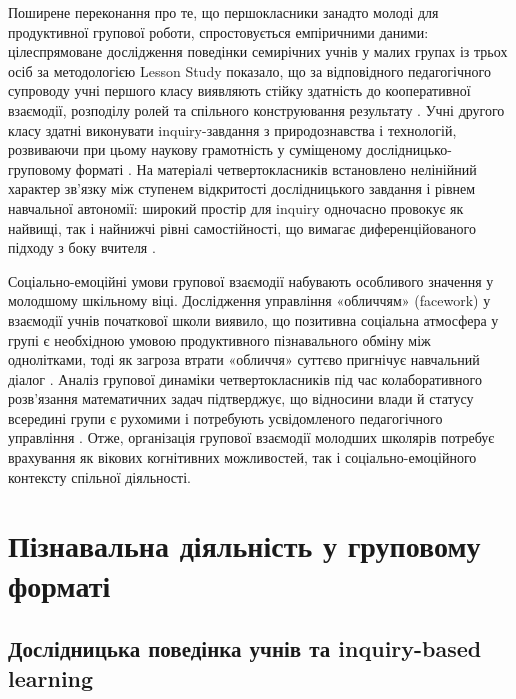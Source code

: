 \documentclass[a4paper,12pt]{article}
\begin{document}
Поширене переконання про те, що першокласники занадто молоді для продуктивної групової роботи, спростовується емпіричними даними: цілеспрямоване дослідження поведінки семирічних учнів у малих групах із трьох осіб за методологією Lesson Study показало, що за відповідного педагогічного супроводу учні першого класу виявляють стійку здатність до кооперативної взаємодії, розподілу ролей та спільного конструювання результату \parencite{Jakavonytė-Staškuvienė2025}. Учні другого класу здатні виконувати inquiry-завдання з природознавства і технологій, розвиваючи при цьому наукову грамотність у суміщеному дослідницько-груповому форматі \parencite{Zuñiga-Quispe2025365}. На матеріалі четвертокласників встановлено нелінійний характер зв'язку між ступенем відкритості дослідницького завдання і рівнем навчальної автономії: широкий простір для inquiry одночасно провокує як найвищі, так і найнижчі рівні самостійності, що вимагає диференційованого підходу з боку вчителя \parencite{Aming'a2026}.

Соціально-емоційні умови групової взаємодії набувають особливого значення у молодшому шкільному віці. Дослідження управління «обличчям» (facework) у взаємодії учнів початкової школи виявило, що позитивна соціальна атмосфера у групі є необхідною умовою продуктивного пізнавального обміну між однолітками, тоді як загроза втрати «обличчя» суттєво пригнічує навчальний діалог \parencite{Evnitskaya2021169}. Аналіз групової динаміки четвертокласників під час колаборативного розв'язання математичних задач підтверджує, що відносини влади й статусу всередині групи є рухомими і потребують усвідомленого педагогічного управління \parencite{Langer-Osuna2020514}. Отже, організація групової взаємодії молодших школярів потребує врахування як вікових когнітивних можливостей, так і соціально-емоційного контексту спільної діяльності.

\newpage


\section{Пізнавальна діяльність у груповому форматі}

\subsection{Дослідницька поведінка учнів та inquiry-based learning}
\end{document}
